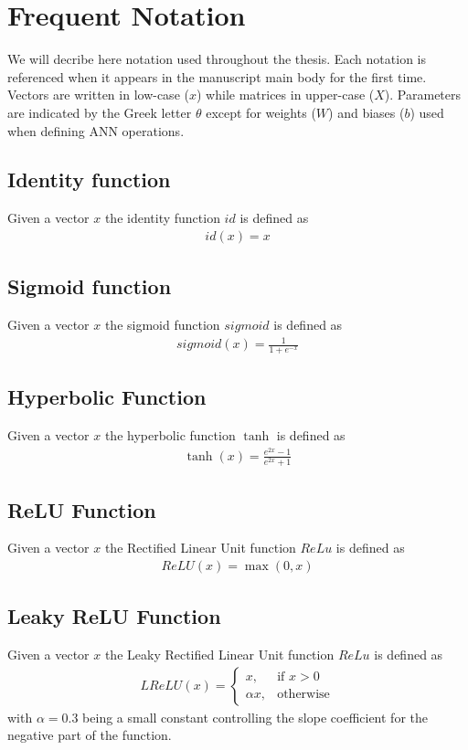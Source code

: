 \chapter{Frequent Notation}

We will decribe here notation used throughout the thesis. Each notation is referenced when it appears in the manuscript main body for the first time. Vectors are written in low-case ($x$) while matrices in upper-case ($X$). Parameters are indicated by the Greek letter $\theta$ except for weights ($W$) and biases ($b$) used when defining ANN operations.

\section{Identity function}
Given a vector $x$ the identity function $id$ is defined as 
\begin{gather}
    \label{identity}
    id(x) = x
\end{gather}

\section{Sigmoid function}
Given a vector $x$ the sigmoid function $sigmoid$ is defined as 
\begin{gather}
    \label{sigmoid}
    sigmoid(x) = \frac {1} {1 + e^{-x}}
\end{gather}

\section{Hyperbolic Function}
Given a vector $x$ the hyperbolic function $\tanh$ is defined as 
\begin{gather}
    \label{tanh}
    \tanh(x) = \frac {e^{2x} -1} {e^{2x} +1}
\end{gather}

\section{ReLU Function}
Given a vector $x$ the Rectified Linear Unit function $ReLu$ is defined as 
\begin{gather}
    \label{relu}
    ReLU(x) = \max(0, x)
\end{gather}

\section{Leaky ReLU Function}
Given a vector $x$ the Leaky Rectified Linear Unit function $ReLu$ is defined as 
\begin{gather}
    \label{lelu}
    LReLU(x) =
    \begin{cases}
        x,& \text{if } x > 0 \\
        \alpha x,              & \text{otherwise}
    \end{cases}
\end{gather}
with $\alpha=0.3$ being a small constant controlling the slope coefficient for the negative part of the function.

